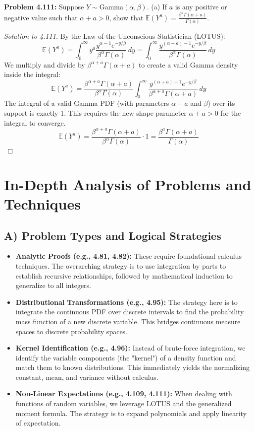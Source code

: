 \documentclass[11pt, a4paper]{article}
\theoremstyle{definition}
\theoremstyle{remark}
\newcommand{\E}{\mathbb{E}}
\begin{document}
\textbf{Problem 4.111:} Suppose $Y \sim \text{Gamma}(\alpha, \beta)$. (a) If $a$ is any positive or negative value such that $\alpha + a > 0$, show that $\E(Y^a) = \frac{\beta^a \Gamma(\alpha+a)}{\Gamma(\alpha)}$.

\begin{proof}[Solution to 4.111]
By the Law of the Unconscious Statistician (LOTUS):
\[ \E(Y^a) = \int_0^\infty y^a \frac{y^{\alpha-1}e^{-y/\beta}}{\beta^\alpha \Gamma(\alpha)} \, dy = \int_0^\infty \frac{y^{(\alpha+a)-1}e^{-y/\beta}}{\beta^\alpha \Gamma(\alpha)} \, dy \]
We multiply and divide by $\beta^{\alpha+a} \Gamma(\alpha+a)$ to create a valid Gamma density inside the integral:
\[ \E(Y^a) = \frac{\beta^{\alpha+a} \Gamma(\alpha+a)}{\beta^\alpha \Gamma(\alpha)} \int_0^\infty \frac{y^{(\alpha+a)-1}e^{-y/\beta}}{\beta^{\alpha+a} \Gamma(\alpha+a)} \, dy \]
The integral of a valid Gamma PDF (with parameters $\alpha+a$ and $\beta$) over its support is exactly 1. This requires the new shape parameter $\alpha+a > 0$ for the integral to converge.
\[ \E(Y^a) = \frac{\beta^{\alpha+a} \Gamma(\alpha+a)}{\beta^\alpha \Gamma(\alpha)} \cdot 1 = \frac{\beta^a \Gamma(\alpha+a)}{\Gamma(\alpha)} \]
\end{proof}

\section{In-Depth Analysis of Problems and Techniques}

\subsection{A) Problem Types and Logical Strategies}
\begin{itemize}
    \item \textbf{Analytic Proofs (e.g., 4.81, 4.82):} These require foundational calculus techniques. The overarching strategy is to use integration by parts to establish recursive relationships, followed by mathematical induction to generalize to all integers.
    \item \textbf{Distributional Transformations (e.g., 4.95):} The strategy here is to integrate the continuous PDF over discrete intervals to find the probability mass function of a new discrete variable. This bridges continuous measure spaces to discrete probability spaces.
    \item \textbf{Kernel Identification (e.g., 4.96):} Instead of brute-force integration, we identify the variable components (the "kernel") of a density function and match them to known distributions. This immediately yields the normalizing constant, mean, and variance without calculus.
    \item \textbf{Non-Linear Expectations (e.g., 4.109, 4.111):} When dealing with functions of random variables, we leverage LOTUS and the generalized moment formula. The strategy is to expand polynomials and apply linearity of expectation.
\end{itemize}
\end{document}
